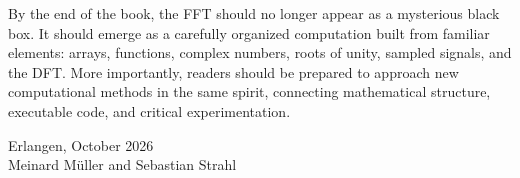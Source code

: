 {By the end of the book, the FFT should no longer appear as a mysterious black box. It should emerge as a carefully organized computation built from familiar elements: arrays, functions, complex numbers, roots of unity, sampled signals, and the DFT. More importantly, readers should be prepared to approach new computational methods in the same spirit, connecting mathematical structure, executable code, and critical experimentation.

\vspace{2em}

\noindent
Erlangen, October 2026\\
Meinard Müller and Sebastian Strahl

}
